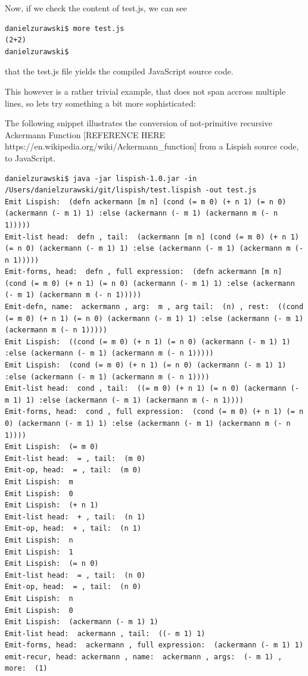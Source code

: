 Now, if we check the content of test.js, we can see
\begin{verbatim}
danielzurawski$ more test.js
(2+2)
danielzurawski$
\end{verbatim}
that the test.js file yields the compiled JavaScript source code. 

This however is a rather trivial example, that does not span accross multiple lines, so lets try something a bit more sophisticated:

The following snippet illustrates the conversion of not-primitive recursive Ackermann Function [REFERENCE HERE https://en.wikipedia.org/wiki/Ackermann_function] from a Lispish source code, to JavaScript. 

\begin{verbatim}
danielzurawski$ java -jar lispish-1.0.jar -in /Users/danielzurawski/git/lispish/test.lispish -out test.js
Emit Lispish:  (defn ackermann [m n] (cond (= m 0) (+ n 1) (= n 0) (ackermann (- m 1) 1) :else (ackermann (- m 1) (ackermann m (- n 1)))))
Emit-list head:  defn , tail:  (ackermann [m n] (cond (= m 0) (+ n 1) (= n 0) (ackermann (- m 1) 1) :else (ackermann (- m 1) (ackermann m (- n 1)))))
Emit-forms, head:  defn , full expression:  (defn ackermann [m n] (cond (= m 0) (+ n 1) (= n 0) (ackermann (- m 1) 1) :else (ackermann (- m 1) (ackermann m (- n 1)))))
Emit-defn, name:  ackermann , arg:  m , arg tail:  (n) , rest:  ((cond (= m 0) (+ n 1) (= n 0) (ackermann (- m 1) 1) :else (ackermann (- m 1) (ackermann m (- n 1)))))
Emit Lispish:  ((cond (= m 0) (+ n 1) (= n 0) (ackermann (- m 1) 1) :else (ackermann (- m 1) (ackermann m (- n 1)))))
Emit Lispish:  (cond (= m 0) (+ n 1) (= n 0) (ackermann (- m 1) 1) :else (ackermann (- m 1) (ackermann m (- n 1))))
Emit-list head:  cond , tail:  ((= m 0) (+ n 1) (= n 0) (ackermann (- m 1) 1) :else (ackermann (- m 1) (ackermann m (- n 1))))
Emit-forms, head:  cond , full expression:  (cond (= m 0) (+ n 1) (= n 0) (ackermann (- m 1) 1) :else (ackermann (- m 1) (ackermann m (- n 1))))
Emit Lispish:  (= m 0)
Emit-list head:  = , tail:  (m 0)
Emit-op, head:  = , tail:  (m 0)
Emit Lispish:  m
Emit Lispish:  0
Emit Lispish:  (+ n 1)
Emit-list head:  + , tail:  (n 1)
Emit-op, head:  + , tail:  (n 1)
Emit Lispish:  n
Emit Lispish:  1
Emit Lispish:  (= n 0)
Emit-list head:  = , tail:  (n 0)
Emit-op, head:  = , tail:  (n 0)
Emit Lispish:  n
Emit Lispish:  0
Emit Lispish:  (ackermann (- m 1) 1)
Emit-list head:  ackermann , tail:  ((- m 1) 1)
Emit-forms, head:  ackermann , full expression:  (ackermann (- m 1) 1)
emit-recur, head: ackermann , name:  ackermann , args:  (- m 1) , more:  (1)

\end{verbatim}
